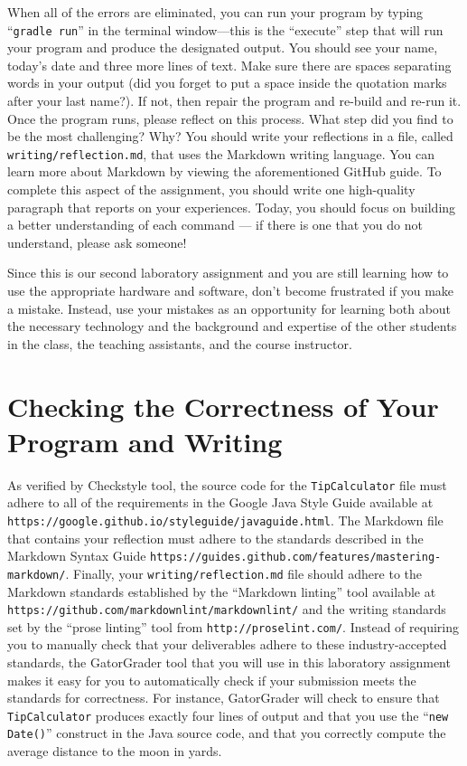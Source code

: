 \documentclass[11pt]{article}
\newcommand{\mainprogram}{\lstinline{TipCalculator}}
\newcommand{\reflection}{\lstinline{writing/reflection.md}}
\newcommand{\gradlerun}{\command{gradle run}}
\newcommand{\command}[1]{``\lstinline{#1}''}
\newcommand{\url}[1]{\lstinline{#1}}
\newcommand{\step}[1]{``{#1}''}
\begin{document}
When all of the errors are eliminated, you can run your program by typing \gradlerun{} in the terminal window---this is
the ``execute'' step that will run your program and produce the designated output. You should see your name, today's
date and three more lines of text. Make sure there are spaces separating words in your output (did you forget to put a
space inside the quotation marks after your last name?). If not, then repair the program and re-build and re-run it.
Once the program runs, please reflect on this process. What step did you find to be the most challenging? Why? You
should write your reflections in a file, called \reflection{}, that uses the Markdown writing language. You can learn
more about Markdown by viewing the aforementioned GitHub guide. To complete this aspect of the assignment, you should
write one high-quality paragraph that reports on your experiences. Today, you should focus on building a better
understanding of each command --- if there is one that you do not understand, please ask someone!

Since this is our second laboratory assignment and you are still learning how to use the appropriate hardware and
software, don't become frustrated if you make a mistake. Instead, use your mistakes as an opportunity for learning both
about the necessary technology and the background and expertise of the other students in the class, the teaching
assistants, and the course instructor.

\section*{Checking the Correctness of Your Program and Writing}

As verified by Checkstyle tool, the source code for the \mainprogram{} file must adhere to all of the requirements in
the Google Java Style Guide available at \url{https://google.github.io/styleguide/javaguide.html}. The Markdown file
that contains your reflection must adhere to the standards described in the Markdown Syntax Guide
\url{https://guides.github.com/features/mastering-markdown/}. Finally, your \reflection{} file should adhere to the
Markdown standards established by the \step{Markdown linting} tool available at
\url{https://github.com/markdownlint/markdownlint/} and the writing standards set by the \step{prose linting} tool from
\url{http://proselint.com/}. Instead of requiring you to manually check that your deliverables adhere to these
industry-accepted standards, the GatorGrader tool that you will use in this laboratory assignment makes it easy for you
to automatically check if your submission meets the standards for correctness. For instance, GatorGrader will check to
ensure that \mainprogram{} produces exactly four lines of output and that you use the \command{new Date()} construct in
the Java source code, and that you correctly compute the average distance to the moon in yards.
\end{document}
